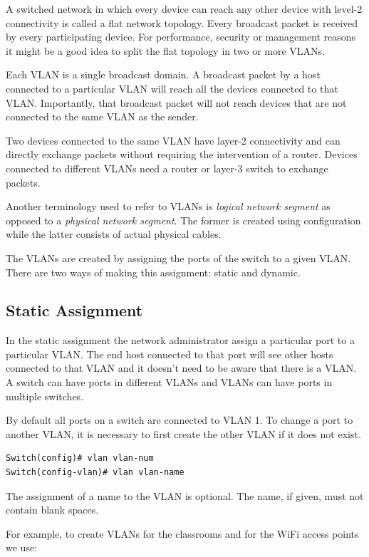 A switched network in which every device can reach any other device with level-2 connectivity is called a flat network topology.
Every broadcast packet is received by every participating device.
For performance, security or management reasons it might be a good idea to split the flat topology in two or more VLANs.

Each VLAN is a single broadcast domain.
A broadcast packet by a host connected to a particular VLAN will reach all the devices connected to that VLAN.
Importantly, that broadcast packet will not reach devices that are not connected to the same VLAN as the sender.

Two devices connected to the same VLAN have layer-2 connectivity and can directly exchange packets without requiring the intervention of a router.
Devices connected to different VLANs need a router or layer-3 switch to exchange packets.

Another terminology used to refer to VLANs is \emph{logical network segment} as opposed to a \emph{physical network segment}.
The former is created using configuration while the latter consists of actual physical cables.

The VLANs are created by assigning the ports of the switch to a given VLAN. 
There are two ways of making this assignment: static and dynamic. 

\subsection{Static Assignment}

In the static assignment the network administrator assign a particular port to a particular VLAN.
The end host connected to that port will see other hosts connected to that VLAN and it doesn't need to be aware that there is a VLAN.
A switch can have ports in different VLANs and VLANs can have ports in multiple switches.

By default all ports on a switch are connected to VLAN 1.
To change a port to another VLAN, it is necessary to first create the other VLAN if it does not exist.

\begin{lstlisting}
Switch(config)# vlan vlan-num
Switch(config-vlan)# vlan vlan-name
\end{lstlisting}

The assignment of a name to the VLAN is optional. 
The name, if given, must not contain blank spaces.

For example, to create VLANs for the classrooms and for the WiFi access points we use:

